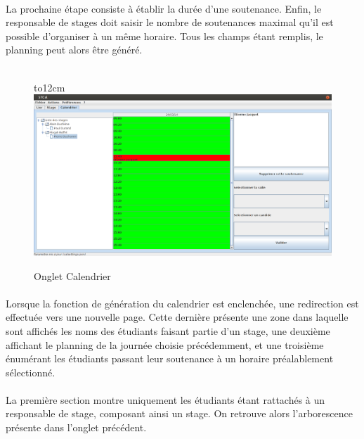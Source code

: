 \documentclass[a4paper,10pt]{report}
\begin{document}
	      \paragraph{}
		La prochaine étape consiste à établir la durée d'une soutenance.
		Enfin, le responsable de stages doit saisir le nombre de soutenances maximal qu'il est possible d'organiser à un même horaire.
		Tous les champs étant remplis, le planning peut alors être généré.
		~\\~\\
		
		\begin{figure}[!h]
		\hbox to12cm{\hss\includegraphics[width=16cm]{Calendrier2.png}\hss}
		\caption{Onglet Calendrier}
		\end{figure}
		
	      \paragraph{}
		Lorsque la fonction de génération du calendrier est enclenchée, une redirection est effectuée vers une nouvelle page.
		Cette dernière présente une zone dans laquelle sont affichés les noms des étudiants faisant partie d'un stage, une deuxième affichant le planning de la journée choisie précédemment, et une troisième énumérant les étudiants passant leur soutenance à un horaire préalablement sélectionné.
		
	      \paragraph{}
		La première section montre uniquement les étudiants étant rattachés à un responsable de stage, composant ainsi un stage.
		On retrouve alors l'arborescence présente dans l'onglet précédent.
		
\end{document}

